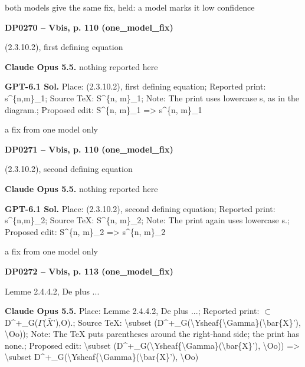 both models give the same fix, held: a model marks it low confidence\par
\par\noindent\hypertarget{DP0270}{}\textbf{DP0270 -- Vbis, p. 110 (one\_model\_fix)}\par
(2.3.10.2), first defining equation\par
\textbf{Claude Opus 5.5.} nothing reported here\par
\textbf{GPT-6.1 Sol.} Place: (2.3.10.2), first defining equation; Reported print: s\textasciicircum{}\{n,m\}\_1; Source TeX: S\textasciicircum{}\{n, m\}\_1; Note: The print uses lowercase s, as in the diagram.; Proposed edit: S\textasciicircum{}\{n, m\}\_1 =\allowbreak > s\textasciicircum{}\{n, m\}\_1\par
a fix from one model only\par
\par\noindent\hypertarget{DP0271}{}\textbf{DP0271 -- Vbis, p. 110 (one\_model\_fix)}\par
(2.3.10.2), second defining equation\par
\textbf{Claude Opus 5.5.} nothing reported here\par
\textbf{GPT-6.1 Sol.} Place: (2.3.10.2), second defining equation; Reported print: s\textasciicircum{}\{n,m\}\_2; Source TeX: S\textasciicircum{}\{n, m\}\_2; Note: The print again uses lowercase s.; Proposed edit: S\textasciicircum{}\{n, m\}\_2 =\allowbreak > s\textasciicircum{}\{n, m\}\_2\par
a fix from one model only\par
\par\noindent\hypertarget{DP0272}{}\textbf{DP0272 -- Vbis, p. 113 (one\_model\_fix)}\par
Lemme 2.4.4.2, De plus ...\par
\textbf{Claude Opus 5.5.} Place: Lemme 2.4.4.2, De plus ...; Reported print: \ensuremath{\subset} D\textasciicircum{}+\_G(\ensuremath{\Gamma}(\ensuremath{\bar{X}}'),O).; Source TeX: \textbackslash{}subset (D\textasciicircum{}+\_G(\textbackslash{}Ysheaf\{\textbackslash{}Gamma\}(\textbackslash{}bar\{X\}'), \textbackslash{}Oo)); Note: The TeX puts parentheses around the right-hand side; the print has none.; Proposed edit: \textbackslash{}subset (D\textasciicircum{}+\_G(\textbackslash{}Ysheaf\{\textbackslash{}Gamma\}(\textbackslash{}bar\{X\}'), \textbackslash{}Oo)) =\allowbreak > \textbackslash{}subset D\textasciicircum{}+\_G(\textbackslash{}Ysheaf\{\textbackslash{}Gamma\}(\textbackslash{}bar\{X\}'), \textbackslash{}Oo)\par
